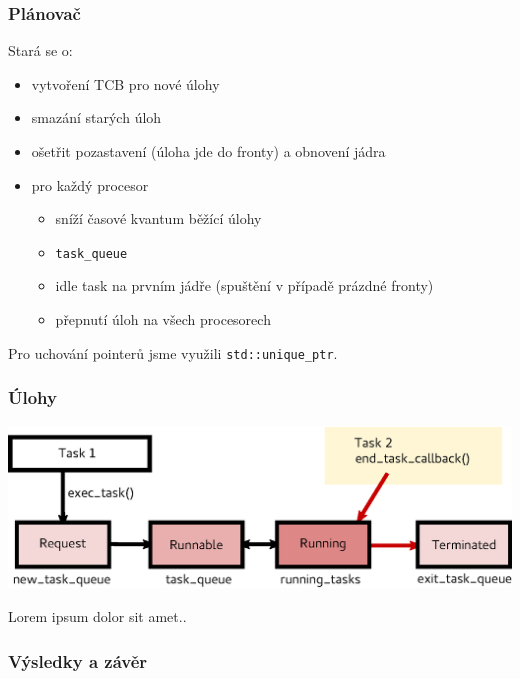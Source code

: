 \documentclass{beamer}
\begin{document}
\begin{frame}
\frametitle{Plánovač}

Stará se o:
\begin{itemize}
  \item vytvoření TCB pro nové úlohy
  \item smazání starých úloh
  \item ošetřit pozastavení (úloha jde do fronty) a obnovení jádra
  \item pro každý procesor
  \begin{itemize}
    \item sníží časové kvantum běžící úlohy
    \item \texttt{task\_queue}
    \item idle task na prvním jádře (spuštění v případě prázdné fronty)
    \item přepnutí úloh na všech procesorech
  \end{itemize}

\end{itemize}
Pro uchování pointerů jsme využili \texttt{std::unique\_ptr}.
\end{frame}

\begin{frame} %
\frametitle{Úlohy}
\includegraphics[width=\textwidth]{obrazky/task_cycle.eps}

Lorem ipsum dolor sit amet..
\end{frame}

\begin{frame} 
\frametitle{Výsledky a závěr}


\end{frame}
\end{document}
